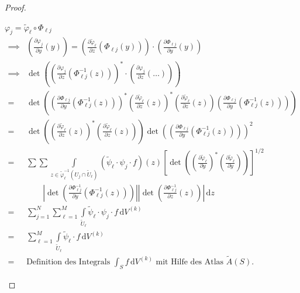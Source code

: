 \documentclass[a4paper,10pt]{scrbook}
\begin{document}
\begin{theorem}[Satz]
\begin{proof}
    \begin{notice*}[Nebenrechnung:] $\varphi_j = \widetilde{\varphi}_\ell \circ \Phi_{\ell j}$
      \begin{align*}
        \implies& \left( \frac{\partial \varphi_j}{\partial y}(y) \right) = \left( \frac{\partial \widetilde{\varphi}_\ell}{\partial z} (\Phi_{\ell j}(y)) \right) \cdot \left( \frac{\partial \Phi_{\ell j}}{\partial y}(y) \right) \\
        \implies& \det \left( \left( \frac{\partial \varphi_j}{\partial z} (\Phi_{\ell j}^{-1}(z)) \right)^* \cdot \left( \frac{\partial \varphi_j}{\partial z} (\ldots) \right) \right) \\
        =& \det \left(
          \left( \frac{\partial \Phi_{\ell j}}{\partial y}(\Phi_{\ell j}^{-1}(z)) \right)^*
          \left( \frac{\partial \widetilde{\varphi}_\ell}{\partial z} (z) \right)^*
          \left( \frac{\partial \widetilde{\varphi}_\ell}{\partial z} (z) \right)
          \left( \frac{\partial \Phi_{\ell j}}{\partial y}(\Phi_{\ell j}^{-1}(z)) \right)
        \right) \\
        =& \det \left(
          \left( \frac{\partial \widetilde{\varphi}_\ell}{\partial z} (z) \right)^*
          \left( \frac{\partial \widetilde{\varphi}_\ell}{\partial z} (z) \right)
        \right)
        \det \left(
          \left( \frac{\partial \Phi_{\ell j}}{\partial y}(\Phi_{\ell j}^{-1}(z)) \right)
        \right)^2 \\
        =& \sum \sum \int\limits_{z \in \widetilde{\varphi}_\ell^{-1}(U_j \cap \widetilde{U}_\ell)}
        \left(\widetilde{\psi}_\ell \cdot \psi_j \cdot f\right)(z)
        \left[ \det \left( \left( \frac{\partial \widetilde{\varphi}_\ell}{\partial y} \right)^* \left( \frac{\partial \widetilde{\varphi}_\ell}{\partial y} \right) \right) \right]^{1/2} \\
        &\qquad
        \left| \det\left( \frac{\partial \Phi_{\ell j}^{-1}}{\partial y} (\Phi_{\ell j}^{-1}(z)) \right) \right|
        \left| \det\left( \frac{\partial \Phi_{\ell j}^{-1}}{\partial z} (z) \right) \right|
        \, \mathrm{d}z \\
        =& \sum\limits_{j=1}^{N} \sum\limits_{\ell = 1}^{M} \int\limits_{\widetilde{U}_\ell} \widetilde{\psi}_\ell \cdot \psi_j \cdot f \, \mathrm{d}V^{(k)} \\
        =& \sum\limits_{\ell = 1}^{M} \int\limits_{\widetilde{U}_\ell} \widetilde{\psi}_\ell \cdot f \, \mathrm{d}V^{(k)} \\
        =& \text{Definition des Integrals $\int_S f \, \mathrm{d}V^{(k)}$ mit Hilfe des Atlas $\widetilde{A}(S)$.}
      \end{align*}
    \end{notice*}
  \end{proof}
\end{theorem}
\end{document}
